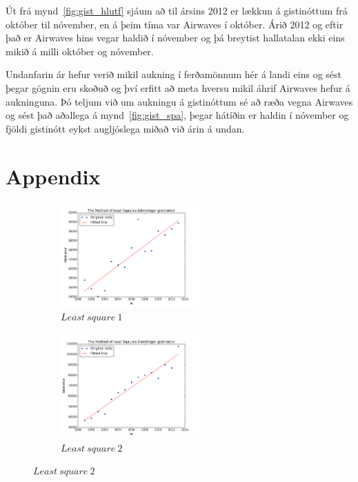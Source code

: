 \documentclass[11pt,a4paper]{amsart}
\theoremstyle{plain}
\theoremstyle{definition}
\theoremstyle{remark}
\begin{document}
Út frá mynd~\ref{fig:gist_hlutf} sjáum að til ársins 2012 er lækkun á gistinóttum frá október til nóvember, en á þeim tíma var Airwaves í október. Árið 2012 og eftir það er Airwaves hins vegar haldið í nóvember og þá breytist hallatalan ekki eins mikið á milli október og nóvember.\par

Undanfarin ár hefur verið mikil aukning í ferðamönnum hér á landi eins og sést þegar gögnin eru skoðuð og því erfitt að meta hversu mikil áhrif Airwaves hefur á aukninguna. Þó teljum við um aukningu á gistinóttum sé að ræða vegna Airwaves og sést það aðallega á mynd~\ref{fig:gist_spa}, þegar hátíðin er haldin í nóvember og fjöldi gistinótt eykst augljóslega miðað við árin á undan.

\section{Appendix}

\begin{figure}[H]
	\centering
	\begin{subfigure}[b]{0.4\textwidth}
		\includegraphics[height=40mm]{mynd2.png}
		\caption{$ Least\ square\ 1$\label{fig:mynd2}}
	\end{subfigure}
	\begin{subfigure}[b]{0.4\textwidth}
		\includegraphics[height=40mm]{mynd3.png}
		\caption{$ Least\ square\ 2 $\label{fig:mynd3}}	
	\end{subfigure}
\end{figure}
\end{document}
